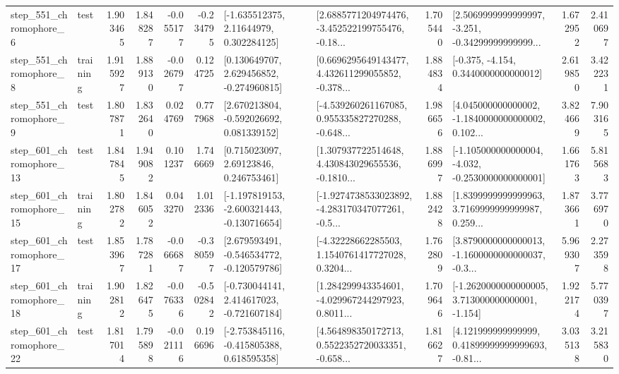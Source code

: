 \begin{tabular}{llrrrrllrlrr}
   step\_551\_chromophore\_6 &      test &      1.903465 &    1.848287 &     -0.055177 & -0.234795 &     [-1.635512375, 2.11644979, 0.302284125] &  [2.6885771204974476, -3.452522199755476, -0.18... &       1.705440 &  [2.5069999999999997, -3.251, -0.34299999999999... &            1.672952 &          2.410697 \\
   step\_551\_chromophore\_8 &  training &      1.915927 &    1.889130 &     -0.026797 &  0.124725 &    [0.130649707, 2.629456852, -0.274960815] &  [0.6696295649143477, 4.432611299055852, -0.378... &       1.884834 &               [-0.375, -4.154, 0.3440000000000012] &            2.619850 &          3.422231 \\
   step\_551\_chromophore\_9 &      test &      1.807871 &    1.832640 &      0.024769 &  0.777968 &    [2.670213804, -0.592026692, 0.081339152] &  [-4.539260261167085, 0.955335827270288, -0.648... &       1.986656 &  [4.045000000000002, -1.1840000000000002, 0.102... &            3.824669 &          7.903165 \\
  step\_601\_chromophore\_13 &      test &      1.847845 &    1.949082 &      0.101237 &  1.746669 &      [0.715023097, 2.69123846, 0.246753461] &  [1.307937722514648, 4.430843029655536, -0.1810... &       1.886997 &  [-1.105000000000004, -4.032, -0.2530000000000001] &            1.661763 &          5.815683 \\
  step\_601\_chromophore\_15 &  training &      1.802782 &    1.846052 &      0.043270 &  1.012336 &  [-1.197819153, -2.600321443, -0.130716654] &  [-1.9274738533023892, -4.283170347077261, -0.5... &       1.882428 &  [1.8399999999999963, 3.7169999999999987, 0.259... &            1.873661 &          3.776970 \\
  step\_601\_chromophore\_17 &      test &      1.853967 &    1.787281 &     -0.066687 & -0.380597 &   [2.679593491, -0.546534772, -0.120579786] &  [-4.32228662285503, 1.1540761417727028, 0.3204... &       1.762809 &  [3.8790000000000013, -1.1600000000000037, -0.3... &            5.969307 &          2.273598 \\
  step\_601\_chromophore\_18 &  training &      1.902812 &    1.826475 &     -0.076336 & -0.502842 &   [-0.730044141, 2.414617023, -0.721607184] &  [1.284299943354601, -4.029967244297923, 0.8011... &       1.709646 &   [-1.2620000000000005, 3.713000000000001, -1.154] &            1.922174 &          5.770397 \\
  step\_601\_chromophore\_22 &      test &      1.817014 &    1.795898 &     -0.021116 &  0.196696 &   [-2.753845116, -0.415805388, 0.618595358] &  [4.564898350172713, 0.5522352720033351, -0.658... &       1.816627 &  [4.121999999999999, 0.41899999999999693, -0.81... &            3.035138 &          3.215830 \\

\end{tabular}
